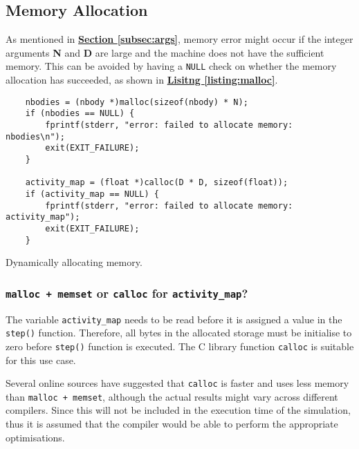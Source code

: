 \documentclass[12pt, a4paper]{article}
\begin{document}
\subsection{Memory Allocation} \label{sec:malloc}

As mentioned in \hyperref[subsec:args]{\textbf{Section \ref*{subsec:args}}}, memory error might
occur if the integer arguments \textbf{N} and \textbf{D} are large and the machine does not have the
sufficient memory. This can be avoided by having a \texttt{NULL} check on whether the memory
allocation has succeeded, as shown in \hyperref[listing:malloc]{\textbf{Lisitng
\ref*{listing:malloc}}}.

\begin{listing}[ht]
\begin{verbatim}
    nbodies = (nbody *)malloc(sizeof(nbody) * N);
    if (nbodies == NULL) {
        fprintf(stderr, "error: failed to allocate memory: nbodies\n");
        exit(EXIT_FAILURE);
    }

    activity_map = (float *)calloc(D * D, sizeof(float));
    if (activity_map == NULL) {
        fprintf(stderr, "error: failed to allocate memory: activity_map");
        exit(EXIT_FAILURE);
    }
\end{verbatim}
\caption{Dynamically allocating memory.} \label{listing:malloc}
\end{listing}

\subsubsection*{\texttt{malloc + memset} or \texttt{calloc} for \texttt{activity_map}?}
The variable \texttt{activity_map} needs to be read before it is assigned a value in the
\texttt{step()} function. Therefore, all bytes in the allocated storage must be initialise to
zero before \texttt{step()} function is executed. The C library function
\texttt{calloc} is suitable for this use case.

Several online sources \cite{malloc_vs_calloc_so, malloc_vs_calloc_blog, why_calloc} have suggested
that \texttt{calloc} is faster and uses less memory than \texttt{malloc + memset},
although the actual results might vary across different compilers. Since this will not be included
in the execution time of the simulation, thus it is assumed that the compiler would be able to
perform the appropriate optimisations.
\end{document}
